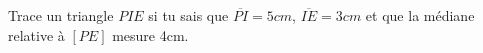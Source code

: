 %
%
	Trace un triangle $PIE$ si tu sais que $\overline{PI}=5cm$, $\overline{IE}=3cm$ et que la médiane relative à $[PE]$ mesure 4cm.
	\vspace{5cm}
